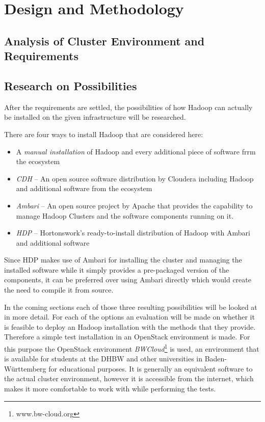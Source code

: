 \chapter{Design and Methodology}
\label{chap:design}

\section{Analysis of Cluster Environment and Requirements}

\section{Research on Possibilities}

After the requirements are settled,
the possibilities of how Hadoop can actually be installed 
on the given infrastructure will be researched.

There are four ways to install Hadoop that are considered here:

\begin{itemize}
    \item A \emph{manual installation} of Hadoop 
        and every additional piece of software frrm the ecosystem
    \item \emph{\ac{CDH}} --  An open source software distribution by Cloudera including Hadoop
        and additional software from the ecosystem
    \item \emph{Ambari} -- An open source project by Apache that provides
        the capability to manage Hadoop Clusters and the software components running on it.
    \item \emph{\ac{HDP}} -- Hortonswork's ready-to-install distribution of Hadoop 
        with Ambari and additional software
\end{itemize}

Since \ac{HDP} makes use of Ambari for installing the cluster and managing the installed software while it simply provides a pre-packaged version of the components, 
it can be preferred over using Ambari directly which would create the need to compile it from source.

In the coming sections each of those three resulting possibilities will be looked at in more detail.
For each of the options an evaluation will be made on whether it is 
feasible to deploy an Hadoop installation with the methods that they provide.
Therefore a simple test installation in an OpenStack environment is made.
For this purpose the OpenStack environment \emph{BWCloud}\footnote{www.bw-cloud.org} is used, an environment that is available for students at the \ac{DHBW} and other universities in Baden-Württemberg for educational purposes. It is generally an equivalent software to the actual cluster environment, however it is accessible from the internet, which makes it more comfortable to work with while performing the tests.

